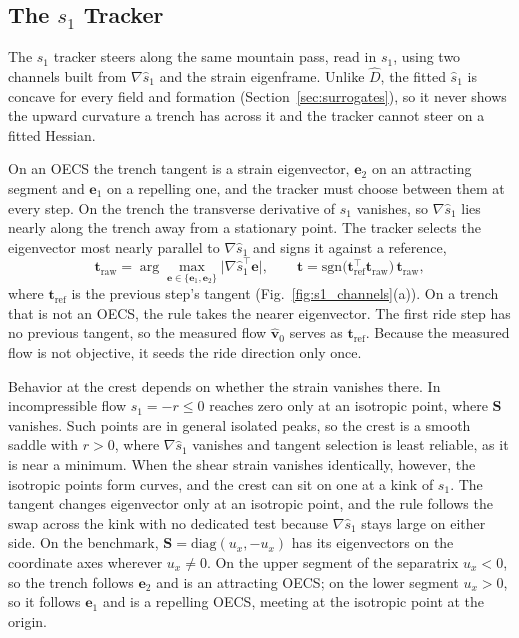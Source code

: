 \subsection{The $s_1$ Tracker}
\label{sec:s1_controller}

The $s_1$ tracker steers along the same mountain pass, read in $s_1$,
using two channels built from $\nabla\hat{s}_1$ and the strain eigenframe.
Unlike $\hat{D}$, the fitted $\hat{s}_1$ is concave for every field and
formation (Section~\ref{sec:surrogates}), so it never shows the upward
curvature a trench has across it and the tracker cannot steer on a fitted
Hessian.

On an OECS the trench tangent is a strain eigenvector, $\mathbf{e}_2$ on
an attracting segment and $\mathbf{e}_1$ on a repelling one, and the
tracker must choose between them at every step. On the trench the
transverse derivative of $s_1$ vanishes, so $\nabla\hat{s}_1$ lies nearly
along the trench away from a stationary point. The tracker selects the
eigenvector most nearly parallel to $\nabla\hat{s}_1$ and signs it against
a reference,
\begin{equation}
    \mathbf{t}_{\mathrm{raw}} =
    \arg\max_{\mathbf{e} \in \{\mathbf{e}_1, \mathbf{e}_2\}}
    \bigl\lvert \nabla\hat{s}_1^\top \mathbf{e} \bigr\rvert,
    \qquad
    \mathbf{t} = \mathrm{sgn}\bigl(\mathbf{t}_{\mathrm{ref}}^\top
    \mathbf{t}_{\mathrm{raw}}\bigr)\,\mathbf{t}_{\mathrm{raw}},
    \label{eq:tangent_select}
\end{equation}
where $\mathbf{t}_{\mathrm{ref}}$ is the previous step's tangent
(Fig.~\ref{fig:s1_channels}(a)). On a trench that is not an OECS, the rule
takes the nearer eigenvector. The first ride step has no previous tangent,
so the measured flow $\hat{\mathbf{v}}_0$ serves as
$\mathbf{t}_{\mathrm{ref}}$. Because the measured flow is not objective, it
seeds the ride direction only once.

Behavior at the crest depends on whether the strain vanishes there. In
incompressible flow $s_1 = -r \leq 0$ reaches zero only at an isotropic
point, where $\mathbf{S}$ vanishes. Such points are in general isolated
peaks, so the crest is a smooth saddle with $r > 0$, where
$\nabla\hat{s}_1$ vanishes and tangent selection is least reliable, as it
is near a minimum. When the shear strain vanishes identically, however,
the isotropic points form curves, and the crest can sit on one at a kink
of $s_1$. The tangent changes eigenvector only at an isotropic point, and
the rule follows the swap across the kink with no dedicated test because
$\nabla\hat{s}_1$ stays large on either side. On the benchmark,
$\mathbf{S} = \mathrm{diag}(u_x, -u_x)$ has its eigenvectors on the
coordinate axes wherever $u_x \neq 0$. On the upper segment of the
separatrix $u_x < 0$, so the trench follows $\mathbf{e}_2$ and is an
attracting OECS; on the lower segment $u_x > 0$, so it follows
$\mathbf{e}_1$ and is a repelling OECS, meeting at the isotropic point at
the origin.

